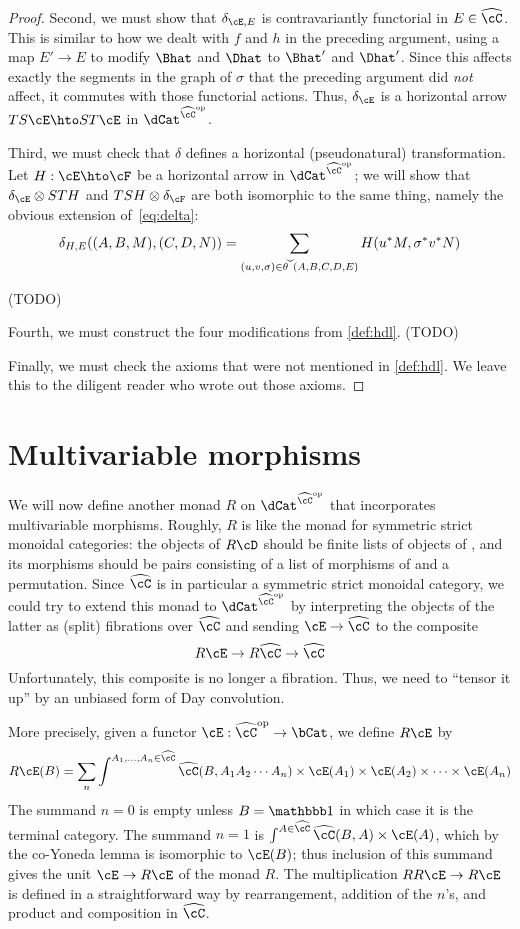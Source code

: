\documentclass{amsart}
\newcommand{\C}{\cC}
\renewcommand{\Chat}{\ensuremath{\widehat{\C}}\xspace}
\newcommand{\thchk}{\ensuremath{\widecheck{\theta}}\xspace}
\newcommand{\E}{\cE}
\newcommand{\F}{\cF}
\newcommand{\one}{\lone}
\begin{document}
\begin{proof}
  Second, we must show that $\delta_{\E,E}$ is contravariantly functorial in $E\in\Chat$.
  This is similar to how we dealt with $f$ and $h$ in the preceding argument, using a map $E'\to E$ to modify $\Bhat$ and $\Dhat$ to $\Bhat'$ and $\Dhat'$.
  Since this affects exactly the segments in the graph of $\sigma$ that the preceding argument did \emph{not} affect, it commutes with those functorial actions.
  Thus, $\delta_\E$ is a horizontal arrow $TS\E \hto ST\E$ in $\dCat^{\Chat\op}$.

  Third, we must check that $\delta$ defines a horizontal (pseudonatural) transformation.
  Let $H:\E\hto \F$ be a horizontal arrow in $\dCat^{\Chat\op}$; we will show that $\delta_\E \otimes STH$ and $TSH\otimes \delta_\F$ are both isomorphic to the same thing, namely the obvious extension of~\eqref{eq:delta}:
  \[ \delta_{H,E}((A,B,M),(C,D,N)) = \sum_{(u,v,\sigma)\in \thchk(A,B,C,D,E)} H(u^*M,\sigma^*v^*N) \]

  (TODO)

  Fourth, we must construct the four modifications from \cref{def:hdl}.
  (TODO)

  Finally, we must check the axioms that were not mentioned in \cref{def:hdl}.
  We leave this to the diligent reader who wrote out those axioms.
\end{proof}

\section{Multivariable morphisms}
\label{sec:multivar}

We will now define another monad $R$ on $\dCat^{\Chat\op}$ that incorporates multivariable morphisms.
Roughly, $R$ is like the monad for symmetric strict monoidal categories: the objects of $R\cD$ should be finite lists of objects of \cD, and its morphisms should be pairs consisting of a list of morphisms of \cD and a permutation.
Since \Chat is in particular a symmetric strict monoidal category, we could try to extend this monad to $\dCat^{\Chat\op}$ by interpreting the objects of the latter as (split) fibrations over $\Chat$ and sending $\E\to \Chat$ to the composite
\[ R\E \to R\Chat \to \Chat \]
Unfortunately, this composite is no longer a fibration.
Thus, we need to ``tensor it up'' by an unbiased form of Day convolution.

More precisely, given a functor $\E:\Chat\op\to \bCat$, we define $R\E$ by
\[ R\E(B) = \sum_n \int^{A_1,\dots,A_n\in\Chat} \Chat(B,A_1 A_2\cdots A_n) \times \E(A_1)\times \E(A_2)\times \cdots\times \E(A_n) \]
The summand $n=0$ is empty unless $B=\one$ in which case it is the terminal category.
The summand $n=1$ is $\int^{A\in\Chat} \Chat(B,A) \times \E(A)$, which by the co-Yoneda lemma is isomorphic to $\E(B)$; thus inclusion of this summand gives the unit $\E\to R\E$ of the monad $R$.
The multiplication $RR\E\to R\E$ is defined in a straightforward way by rearrangement, addition of the $n$'s, and product and composition in $\Chat$.
\end{document}
